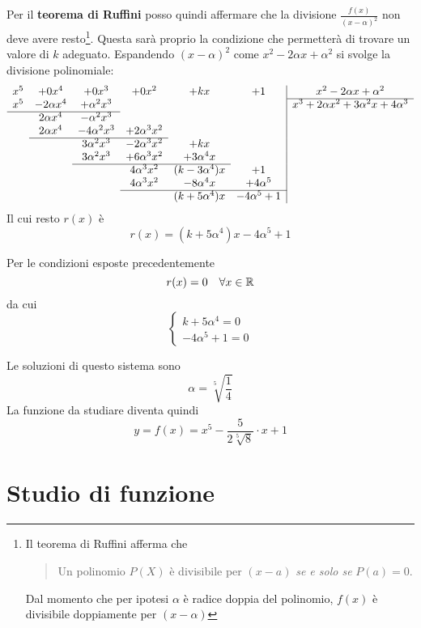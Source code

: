 \documentclass[a4paper, oneside, titlepage, reqno]{book}
\begin{document}
Per il \textbf{teorema di Ruffini} \parencite[vol. 1, p. ??]{blu:1} posso quindi affermare che la divisione $\frac{f(x)}{(x-\alpha)^2}$ non deve avere resto\footnote{Il teorema di Ruffini afferma che%
\begin{quotation}
Un polinomio $P(X)$ è divisibile per $(x-a)$ \textit{se e solo se} $P(a)=0$.
\end{quotation}
Dal momento che per ipotesi $\alpha$ è radice doppia del polinomio, $f(x)$ è divisibile doppiamente per $(x-\alpha)$}. Questa sarà proprio la condizione che permetterà di trovare un valore di $k$ adeguato.
Espandendo $(x-\alpha)^2$ come $x^2-2\alpha x+\alpha^2$ si svolge la divisione polinomiale:
\[
\begin{array}{cccccc|c}
x^5 & +0x^4 & +0x^3 & +0x^2 & +kx & +1  & x^2-2\alpha x+\alpha^2\\ \cline{7-7}
x^5 & -2\alpha x^4 & +\alpha^2x^3 & & & & x^3+2\alpha x^2+3\alpha^2x+4\alpha^3\\\cline{1-3}
& 2\alpha x^4 & -\alpha^2x^3 & & & & \\
& 2\alpha x^4 & -4\alpha^2x^3 & +2\alpha^3x^2 & & & \\
\cline{2-4}
& & 3\alpha^2x^3 & -2\alpha^3x^2 &+ kx & & \\
& & 3\alpha^2x^3 & +6\alpha^3x^2 & +3\alpha^4x & & \\
\cline{3-5}
& & & 4\alpha^3x^2 & (k-3\alpha^4)x & + 1& \\
& & & 4\alpha^3x^2 & -8\alpha^4x & +4\alpha^5 & \\
\cline{4-6}
& & & & (k+5\alpha^4)x & -4\alpha^5 + 1& 
\end{array}
\]
Il cui resto $r(x)$ è
\[
r(x)=(k+5\alpha^4)x -4\alpha^5 + 1
\]

Per le condizioni esposte precedentemente
\[
r(x)=0\quad \forall x\in \mathbb{R}
\]
da cui
\[
\begin{cases}
k+5\alpha^4=0\\
-4\alpha^5+1=0
\end{cases}
\]

Le soluzioni di questo sistema sono
\[
\alpha=\sqrt[5]{\frac{1}{4}}
\]
La funzione da studiare diventa quindi
\begin{equation}\label{eq:2}
y=f(x)=x^5-\frac{5}{2\sqrt[5]{8}}\cdot x+1
\end{equation}

\section{Studio di funzione}
\end{document}
